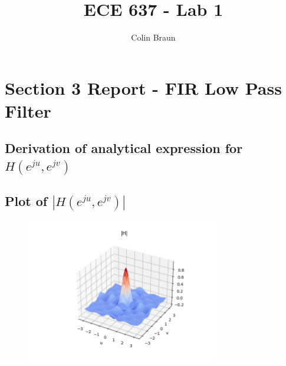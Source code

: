 \documentclass{article}
\title{ECE 637 - Lab 1}
\author{Colin Braun}
\begin{document}
\maketitle

\section{Section 3 Report - FIR Low Pass Filter}
\subsection{Derivation of analytical expression for $H(e^{ju}, e^{jv})$}
\subsection{Plot of $|H(e^{ju}, e^{jv})|$}
\begin{figure}[H]
    \centering
    \includegraphics[width=0.75\textwidth]{../results/section3-python.png}
    \begin{center}
    \end{center}
\end{figure}
\end{document}
